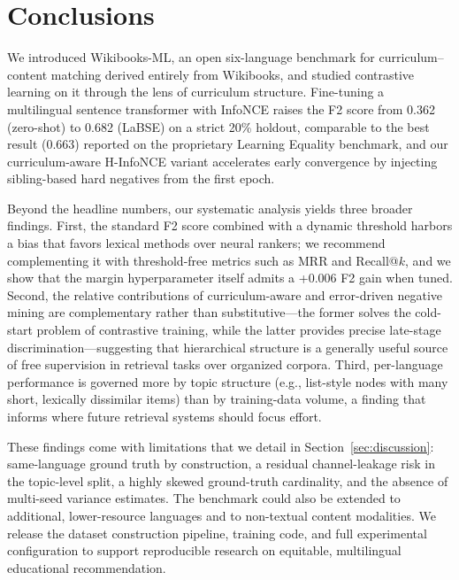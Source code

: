 \documentclass[applsci,article,submit,pdftex,moreauthors]{Definitions/mdpi}
\begin{document}
\section{Conclusions}\label{sec:conclusion}

We introduced Wikibooks-ML, an open six-language benchmark for curriculum--content matching derived entirely from Wikibooks, and studied contrastive learning on it through the lens of curriculum structure. Fine-tuning a multilingual sentence transformer with InfoNCE raises the F2 score from 0.362 (zero-shot) to 0.682 (LaBSE) on a strict 20\% holdout, comparable to the best result (0.663) reported on the proprietary Learning Equality benchmark, and our curriculum-aware H-InfoNCE variant accelerates early convergence by injecting sibling-based hard negatives from the first epoch.

Beyond the headline numbers, our systematic analysis yields three broader findings. First, the standard F2 score combined with a dynamic threshold harbors a bias that favors lexical methods over neural rankers; we recommend complementing it with threshold-free metrics such as MRR and Recall@$k$, and we show that the margin hyperparameter itself admits a +0.006 F2 gain when tuned. Second, the relative contributions of curriculum-aware and error-driven negative mining are complementary rather than substitutive---the former solves the cold-start problem of contrastive training, while the latter provides precise late-stage discrimination---suggesting that hierarchical structure is a generally useful source of free supervision in retrieval tasks over organized corpora. Third, per-language performance is governed more by topic structure (e.g., list-style nodes with many short, lexically dissimilar items) than by training-data volume, a finding that informs where future retrieval systems should focus effort.

These findings come with limitations that we detail in Section~\ref{sec:discussion}: same-language ground truth by construction, a residual channel-leakage risk in the topic-level split, a highly skewed ground-truth cardinality, and the absence of multi-seed variance estimates. The benchmark could also be extended to additional, lower-resource languages and to non-textual content modalities. We release the dataset construction pipeline, training code, and full experimental configuration to support reproducible research on equitable, multilingual educational recommendation.

\vspace{6pt}
\end{document}
